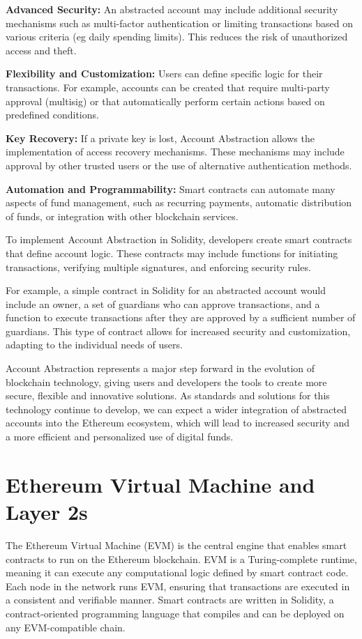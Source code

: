 \textbf{Advanced Security:} An abstracted account may include additional security mechanisms such as multi-factor authentication or limiting transactions based on various criteria (eg daily spending limits). This reduces the risk of unauthorized access and theft.

\textbf{Flexibility and Customization:} Users can define specific logic for their transactions. For example, accounts can be created that require multi-party approval (multisig) or that automatically perform certain actions based on predefined conditions.

\textbf{Key Recovery:} If a private key is lost, Account Abstraction allows the implementation of access recovery mechanisms. These mechanisms may include approval by other trusted users or the use of alternative authentication methods.

\textbf{Automation and Programmability:} Smart contracts can automate many aspects of fund management, such as recurring payments, automatic distribution of funds, or integration with other blockchain services.

To implement Account Abstraction in Solidity, developers create smart contracts that define account logic. These contracts may include functions for initiating transactions, verifying multiple signatures, and enforcing security rules.

For example, a simple contract in Solidity for an abstracted account would include an owner, a set of guardians who can approve transactions, and a function to execute transactions after they are approved by a sufficient number of guardians. This type of contract allows for increased security and customization, adapting to the individual needs of users.

Account Abstraction represents a major step forward in the evolution of blockchain technology, giving users and developers the tools to create more secure, flexible and innovative solutions. As standards and solutions for this technology continue to develop, we can expect a wider integration of abstracted accounts into the Ethereum ecosystem, which will lead to increased security and a more efficient and personalized use of digital funds.

 \section{Ethereum Virtual Machine and Layer 2s}
\label{sec:ch2sec7} 
The Ethereum Virtual Machine (EVM) is the central engine that enables smart contracts to run on the Ethereum blockchain. EVM is a Turing-complete runtime, meaning it can execute any computational logic defined by smart contract code. Each node in the network runs EVM, ensuring that transactions are executed in a consistent and verifiable manner. Smart contracts are written in Solidity, a contract-oriented programming language that compiles and can be deployed on any EVM-compatible chain.

